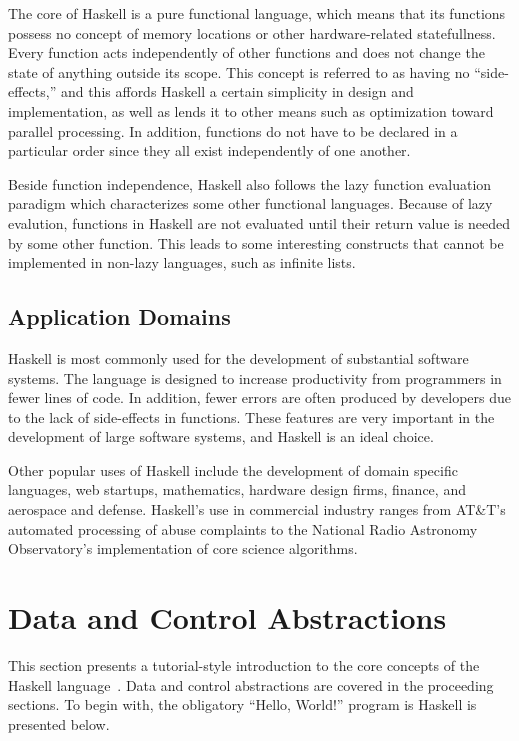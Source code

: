 \documentclass[titlepage,12pt]{article}
\begin{document}
The core of Haskell is a pure functional language, which means that its functions possess no concept of memory locations or other
hardware-related statefullness. Every function acts independently of other functions and does not change the state of anything outside 
its scope. This concept is referred to as having no ``side-effects,'' and this affords Haskell a certain simplicity in design
and implementation, as well as lends it to other means such as optimization toward parallel processing. In addition,
functions do not have to be declared in a particular order since they all exist independently of one another.

Beside function independence, Haskell also follows the lazy function evaluation paradigm which characterizes some other functional 
languages. Because of lazy evalution, functions in Haskell are not evaluated until their return value is needed by some other function.
This leads to some interesting constructs that cannot be implemented in non-lazy languages, such as infinite lists.

\subsection{Application Domains}

Haskell is most commonly used for the development of substantial software systems. The language is designed to increase
productivity from programmers in fewer lines of code. In addition, fewer errors are often produced by developers due to the lack of
side-effects in functions.  These features are very important in the development of large software systems, and Haskell is an ideal choice. 

Other popular uses of Haskell include the development of domain specific languages, web startups, mathematics, 
hardware design firms, finance, and aerospace and defense. Haskell's use in commercial industry ranges from AT\&T's 
automated processing of abuse complaints to the National Radio Astronomy Observatory’s implementation of core science algorithms.


\section{Data and Control Abstractions}
This section presents a tutorial-style introduction to the core concepts of
the Haskell language~\cite{learnyouahaskell}.  Data and control abstractions are covered
in the proceeding sections.  To begin with, the obligatory ``Hello, World!'' program is Haskell
is presented below.
\end{document}

